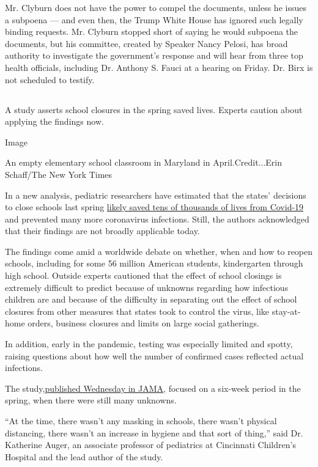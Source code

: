 Mr. Clyburn does not have the power to compel the documents, unless he
issues a subpoena --- and even then, the Trump White House has ignored
such legally binding requests. Mr. Clyburn stopped short of saying he
would subpoena the documents, but his committee, created by Speaker
Nancy Pelosi, has broad authority to investigate the government's
response and will hear from three top health officials, including Dr.
Anthony S. Fauci at a hearing on Friday. Dr. Birx is not scheduled to
testify.

\hypertarget{-5}{%
\subsection{}\label{-5}}

A study asserts school closures in the spring saved lives. Experts
caution about applying the findings now.

Image

An empty elementary school classroom in Maryland in April.Credit...Erin
Schaff/The New York Times

In a new analysis, pediatric researchers have estimated that the states'
decisions to close schools last spring
\href{https://www.nytimes3xbfgragh.onion/2020/07/29/health/covid-school-reopening.html}{likely
saved tens of thousands of lives from Covid-19} and prevented many more
coronavirus infections. Still, the authors acknowledged that their
findings are not broadly applicable today.

The findings come amid a worldwide debate on whether, when and how to
reopen schools, including for some 56 million American students,
kindergarten through high school. Outside experts cautioned that the
effect of school closings is extremely difficult to predict because of
unknowns regarding how infectious children are and because of the
difficulty in separating out the effect of school closures from other
measures that states took to control the virus, like stay-at-home
orders, business closures and limits on large social gatherings.

In addition, early in the pandemic, testing was especially limited and
spotty, raising questions about how well the number of confirmed cases
reflected actual infections.

The
study,\href{https://jamanetwork.com/journals/jama/fullarticle/10.1001/jama.2020.14348}{published
Wednesday in JAMA}, focused on a six-week period in the spring, when
there were still many unknowns.

``At the time, there wasn't any masking in schools, there wasn't
physical distancing, there wasn't an increase in hygiene and that sort
of thing,'' said Dr. Katherine Auger, an associate professor of
pediatrics at Cincinnati Children's Hospital and the lead author of the
study.

